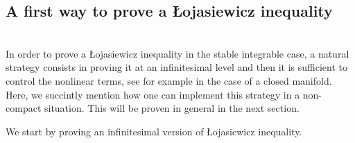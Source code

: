 \documentclass[a4paper,11pt,reqno]{amsart}
\numberwithin{equation}{section}
\begin{document}
	
	
	\subsection{A first way to prove a \L{}ojasiewicz inequality}\label{naive-loja-sec}~~\\
	
		
	
	In order to prove a \L{}ojasiewicz inequality in the stable integrable case, a natural strategy consists in proving it at an infinitesimal level and then it is sufficient to control the nonlinear terms, see \cite{Has-Sta} for example in the case of a closed manifold. Here, we succintly mention how one can implement this strategy in a non-compact situation. This will be proven in general in the next section.
	
	We start by proving an infinitesimal version of \L{}ojasiewicz inequality.
	
\end{document}
